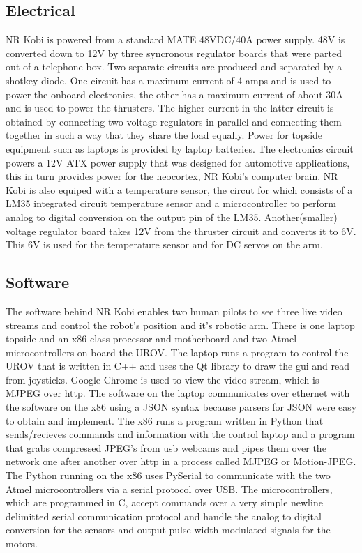 \documentclass{proposalnsf}
\begin{document}
\subsection{Electrical}
NR Kobi is powered from a standard MATE 48VDC/40A power supply. 48V is converted down to 12V by three syncronous regulator boards that were parted out of a telephone box. Two separate circuits are produced and separated by a shotkey diode. One circuit has a maximum current of 4 amps and is used to power the onboard electronics, the other has a maximum current of about 30A and is used to power the thrusters. The higher current in the latter circuit is obtained by connecting two voltage regulators in parallel and connecting them together in such a way that they share the load equally. Power for topside equipment such as laptops is provided by laptop batteries. The electronics circuit powers a 12V ATX power supply that was designed for automotive applications, this in turn provides power for the neocortex, NR Kobi's computer brain. NR Kobi is also equiped with a temperature sensor, the circut for which consists of a LM35 integrated circuit temperature sensor and a microcontroller to perform analog to digital conversion on the output pin of the LM35. Another(smaller) voltage regulator board takes 12V from the thruster circuit and converts it to 6V. This 6V is used for the temperature sensor and for DC servos on the arm. 
\subsection{Software}
The software behind NR Kobi enables two human pilots to see three live video streams and control the robot's position and it's robotic arm. There is one laptop topside and an x86 class processor and motherboard and two Atmel microcontrollers on-board the UROV. The laptop runs a program to control the UROV that is written in C++ and uses the Qt library to draw the gui and read from joysticks. Google Chrome is used to view the video stream, which is MJPEG over http. The software on the laptop communicates over ethernet with the software on the x86 using a JSON syntax because parsers for JSON were easy to obtain and implement. The x86 runs a program written in Python that sends/recieves commands and information with the control laptop and a program that grabs compressed JPEG's from usb webcams and pipes them over the network one after another over http in a process called MJPEG or Motion-JPEG. The Python running on the x86 uses PySerial to communicate with the two Atmel microcontrollers via a serial protocol over USB. The microcontrollers, which are programmed in C, accept commands over a very simple newline delimitted serial communication protocol and handle the analog to digital conversion for the sensors and output pulse width modulated signals for the motors. 
\end{document}
